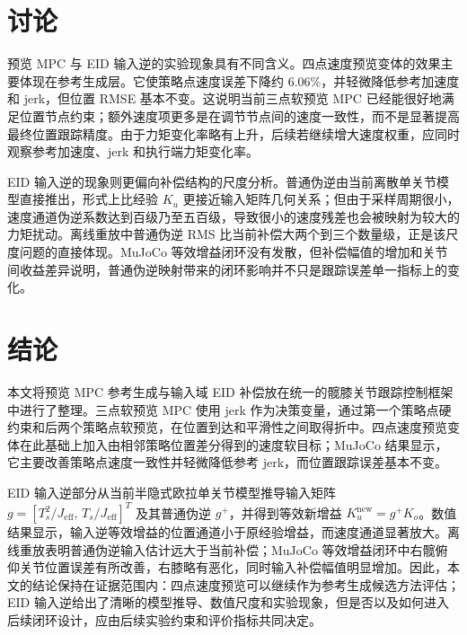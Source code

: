 \documentclass[12pt,a4paper]{ctexart}
\begin{document}
\section{讨论}

预览 MPC 与 EID 输入逆的实验现象具有不同含义。四点速度预览变体的效果主要体现在参考生成层。它使策略点速度误差下降约 \(6.06\%\)，并轻微降低参考加速度和 jerk，但位置 RMSE 基本不变。这说明当前三点软预览 MPC 已经能很好地满足位置节点约束；额外速度项更多是在调节节点间的速度一致性，而不是显著提高最终位置跟踪精度。由于力矩变化率略有上升，后续若继续增大速度权重，应同时观察参考加速度、jerk 和执行端力矩变化率。

EID 输入逆的现象则更偏向补偿结构的尺度分析。普通伪逆由当前离散单关节模型直接推出，形式上比经验 \(K_u\) 更接近输入矩阵几何关系；但由于采样周期很小，速度通道伪逆系数达到百级乃至五百级，导致很小的速度残差也会被映射为较大的力矩扰动。离线重放中普通伪逆 RMS 比当前补偿大两个到三个数量级，正是该尺度问题的直接体现。MuJoCo 等效增益闭环没有发散，但补偿幅值的增加和关节间收益差异说明，普通伪逆映射带来的闭环影响并不只是跟踪误差单一指标上的变化。

\section{结论}

本文将预览 MPC 参考生成与输入域 EID 补偿放在统一的髋膝关节跟踪控制框架中进行了整理。三点软预览 MPC 使用 jerk 作为决策变量，通过第一个策略点硬约束和后两个策略点软预览，在位置到达和平滑性之间取得折中。四点速度预览变体在此基础上加入由相邻策略位置差分得到的速度软目标；MuJoCo 结果显示，它主要改善策略点速度一致性并轻微降低参考 jerk，而位置跟踪误差基本不变。

EID 输入逆部分从当前半隐式欧拉单关节模型推导输入矩阵 \(g=[T_s^2/J_\mathrm{eff},\,T_s/J_\mathrm{eff}]^T\) 及其普通伪逆 \(g^+\)，并得到等效新增益 \(K_u^{\mathrm{new}}=g^+K_o\)。数值结果显示，输入逆等效增益的位置通道小于原经验增益，而速度通道显著放大。离线重放表明普通伪逆输入估计远大于当前补偿；MuJoCo 等效增益闭环中右髋俯仰关节位置误差有所改善，右膝略有恶化，同时输入补偿幅值明显增加。因此，本文的结论保持在证据范围内：四点速度预览可以继续作为参考生成候选方法评估；EID 输入逆给出了清晰的模型推导、数值尺度和实验现象，但是否以及如何进入后续闭环设计，应由后续实验约束和评价指标共同决定。
\end{document}
